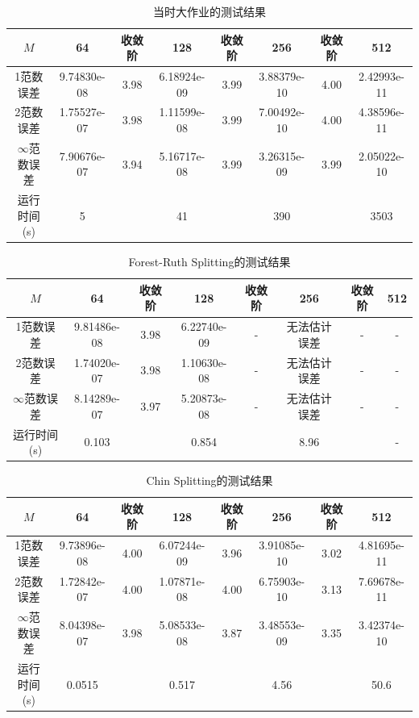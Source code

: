 \documentclass[lang=cn,10pt,bibend=bibtex]{elegantbook}
\begin{document}
\begin{table}[H]
    \centering
    \small
    \begin{tabular}{c|ccccccc}
    \textbf{$M$}              & 64          & 收敛阶 & 128         & 收敛阶 & 256         & 收敛阶 & 512   \\ \hline
    1范数误差                  & 9.74830e-08 & 3.98  & 6.18924e-09 & 3.99  & 3.88379e-10 &  4.00 & 2.42993e-11 \\
    2范数误差                  & 1.75527e-07 & 3.98  & 1.11599e-08 & 3.99  & 7.00492e-10 &  4.00 & 4.38596e-11 \\
    $\infty$范数误差           & 7.90676e-07 & 3.94  & 5.16717e-08 & 3.99  & 3.26315e-09 &  3.99 & 2.05022e-10 \\
    运行时间(s)                & 5           &       & 41          &       & 390         &       & 3503
    \end{tabular}
    \caption{当时大作业的测试结果}
\end{table}

\begin{table}[H]
    \centering
    \small
    \begin{tabular}{c|ccccccc}
    \textbf{$M$}              & 64          & 收敛阶 & 128         & 收敛阶 & 256         & 收敛阶 & 512   \\ \hline
    1范数误差                  & 9.81486e-08 & 3.98  & 6.22740e-09 &  - & 无法估计误差 &  - & - \\
    2范数误差                  & 1.74020e-07 & 3.98  & 1.10630e-08 &  - & 无法估计误差 &  - & - \\
    $\infty$范数误差           & 8.14289e-07 & 3.97  & 5.20873e-08 &  - & 无法估计误差 &  - & - \\
    运行时间(s)                & 0.103           &       & 0.854          &       & 8.96         &       & -
    \end{tabular}
    \caption{Forest-Ruth Splitting的测试结果}
\end{table}

\begin{table}[H]
    \centering
    \small
    \begin{tabular}{c|ccccccc}
    \textbf{$M$}              & 64          & 收敛阶 & 128         & 收敛阶 & 256         & 收敛阶 & 512   \\ \hline
    1范数误差                  & 9.73896e-08 & 4.00  & 6.07244e-09 & 3.96  & 3.91085e-10 &  3.02 & 4.81695e-11 \\
    2范数误差                  & 1.72842e-07 & 4.00  & 1.07871e-08 & 4.00  & 6.75903e-10 &  3.13 & 7.69678e-11 \\
    $\infty$范数误差           & 8.04398e-07 & 3.98  & 5.08533e-08 & 3.87  & 3.48553e-09 &  3.35 & 3.42374e-10 \\
    运行时间(s)                & 0.0515          &       & 0.517          &       & 4.56         &       & 50.6
    \end{tabular}
    \caption{Chin Splitting的测试结果}
\end{table}
\end{document}

